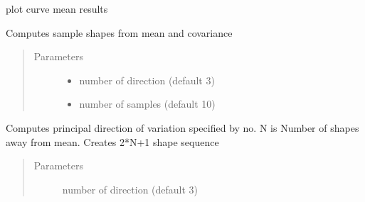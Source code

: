 \documentclass[letterpaper,10pt,english]{sphinxmanual}
\begin{document}
\begin{fulllineitems}
\begin{fulllineitems}
\end{fulllineitems}


\begin{fulllineitems}
\label{\detokenize{curve_statistics:curve_stats.fdacurve.plot}}
plot curve mean results

\end{fulllineitems}


\begin{fulllineitems}
\label{\detokenize{curve_statistics:curve_stats.fdacurve.sample_shapes}}
Computes sample shapes from mean and covariance
\begin{quote}\begin{description}
\item[{Parameters}] \leavevmode\begin{itemize}
\item {} 
 \textendash{} number of direction (default 3)

\item {} 
 \textendash{} number of samples (default 10)

\end{itemize}

\end{description}\end{quote}

\end{fulllineitems}


\begin{fulllineitems}
\label{\detokenize{curve_statistics:curve_stats.fdacurve.shape_pca}}
Computes principal direction of variation specified by no. N is
Number of shapes away from mean. Creates 2*N+1 shape sequence
\begin{quote}\begin{description}
\item[{Parameters}] \leavevmode
{} \textendash{} number of direction (default 3)


\end{description}
\end{quote}
\end{fulllineitems}
\end{fulllineitems}
\end{document}
